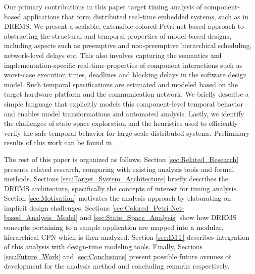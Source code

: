 Our primary contributions in this paper target timing analysis of component-based applications that form distributed real-time embedded systems, such as in DREMS. We present a scalable, extensible colored Petri net-based \cite{CPN} approach to abstracting the structural and temporal properties of model-based designs, including aspects such as preemptive and non-preemptive hierarchical scheduling, network-level delays etc. This also involves capturing the semantics and implementation-specific real-time properties of component interactions such as worst-case execution times, deadlines and blocking delays in the software design model. Such temporal specifications are estimated and modeled based on the target hardware platform and the communication network. We briefly describe %
a simple language that explicitly models this  component-level temporal behavior and enables model transformations and automated analysis. Lastly, we identify the challenges of state space exploration and the heuristics used to efficiently verify the safe temporal behavior for large-scale distributed systems. Preliminary results of this work can be found in \cite{MoDeVVa}.
 
The rest of this paper is organized as follows. Section \ref{sec:Related_Research} presents related research, comparing with existing analysis tools and formal methods. Sections \ref{sec:Target_System_Architecture} briefly describes the DREMS architecture, specifically the concepts of interest for timing analysis. Section \ref{sec:Motivation} motivates the analysis approach by elaborating on implicit design challenges. Sections \ref{sec:Colored_Petri Net-based_Analysis_Model} and \ref{sec:State_Space_Analysis} show how DREMS concepts pertaining to a sample application are mapped into a modular, hierarchical CPN which is then analyzed. Section \ref{sec:IMT} describes integration of this analysis with design-time modeling tools. Finally, Sections \ref{sec:Future_Work} and \ref{sec:Conclusions} present possible future avenues of development for the analysis method and concluding remarks respectively.